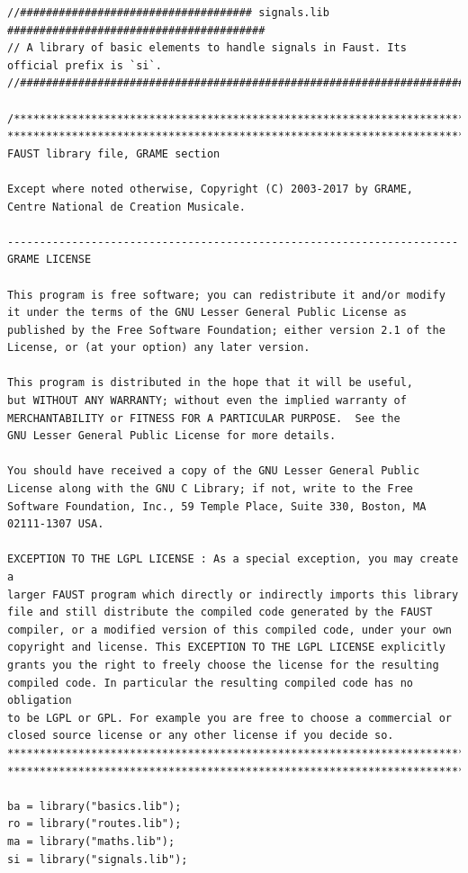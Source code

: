 \documentclass{article}
\begin{document}
\bigskip\bigskip
\begin{lstlisting}[caption=\texttt{signals.lib}]
//#################################### signals.lib ########################################
// A library of basic elements to handle signals in Faust. Its official prefix is `si`.
//########################################################################################

/************************************************************************
************************************************************************
FAUST library file, GRAME section

Except where noted otherwise, Copyright (C) 2003-2017 by GRAME,
Centre National de Creation Musicale.

----------------------------------------------------------------------
GRAME LICENSE

This program is free software; you can redistribute it and/or modify
it under the terms of the GNU Lesser General Public License as
published by the Free Software Foundation; either version 2.1 of the
License, or (at your option) any later version.

This program is distributed in the hope that it will be useful,
but WITHOUT ANY WARRANTY; without even the implied warranty of
MERCHANTABILITY or FITNESS FOR A PARTICULAR PURPOSE.  See the
GNU Lesser General Public License for more details.

You should have received a copy of the GNU Lesser General Public
License along with the GNU C Library; if not, write to the Free
Software Foundation, Inc., 59 Temple Place, Suite 330, Boston, MA
02111-1307 USA.

EXCEPTION TO THE LGPL LICENSE : As a special exception, you may create a
larger FAUST program which directly or indirectly imports this library
file and still distribute the compiled code generated by the FAUST
compiler, or a modified version of this compiled code, under your own
copyright and license. This EXCEPTION TO THE LGPL LICENSE explicitly
grants you the right to freely choose the license for the resulting
compiled code. In particular the resulting compiled code has no obligation
to be LGPL or GPL. For example you are free to choose a commercial or
closed source license or any other license if you decide so.
************************************************************************
************************************************************************/

ba = library("basics.lib");
ro = library("routes.lib");
ma = library("maths.lib");
si = library("signals.lib");


\end{lstlisting}
\end{document}
